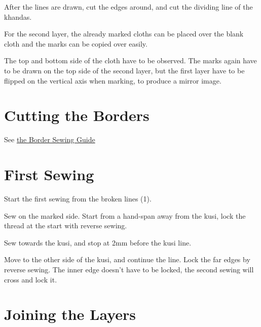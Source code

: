 After the lines are drawn, cut the edges around, and cut the dividing
line of the khandas.

For the second layer, the already marked cloths can be placed over the
blank cloth and the marks can be copied over easily.

The top and bottom side of the cloth have to be observed. The marks
again have to be drawn on the top side of the second layer, but the
first layer have to be flipped on the vertical axis when marking, to
produce a mirror image.

\setlength{\nextPhotoWidth}{0.6\textwidth}


\section{Cutting the Borders}

See \href{/en/borders}{the Border Sewing Guide}

\section{First Sewing}

Start the first sewing from the broken lines (1).

\setlength{\nextPhotoWidth}{0.5\textwidth}


\setlength{\nextPhotoWidth}{0.5\textwidth}


Sew on the marked side. Start from a hand-span away from the kusi, lock
the thread at the start with reverse sewing.

Sew towards the kusi, and stop at 2mm before the kusi line.

Move to the other side of the kusi, and continue the line. Lock the far
edges by reverse sewing. The inner edge doesn't have to be locked, the
second sewing will cross and lock it.

\setlength{\nextPhotoWidth}{0.5\textwidth}


\section{Joining the Layers}

